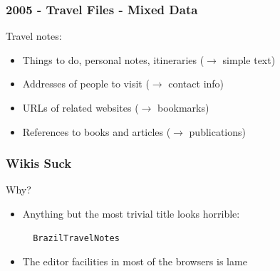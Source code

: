\documentclass{beamer}
\begin{document}
\begin{frame}[fragile]
  \frametitle{2005 - Travel Files - Mixed Data}

Travel notes:
\begin{itemize}
\item Things to do, personal notes, itineraries ($\rightarrow$ simple text)
\item Addresses of people to visit ($\rightarrow$ contact info)
\item URLs of related websites ($\rightarrow$ bookmarks)
\item References to books and articles ($\rightarrow$ publications)
\end{itemize}




% 
% 
% 
% 
%
% 


\end{frame}


\begin{frame}[fragile]
  \frametitle{Wikis Suck}

Why?

\begin{itemize}

\item Anything but the most trivial title looks horrible:

\begin{verbatim}
  BrazilTravelNotes
\end{verbatim}

\item The editor facilities in most of the browsers is lame


\end{itemize}

\end{frame}
\end{document}
